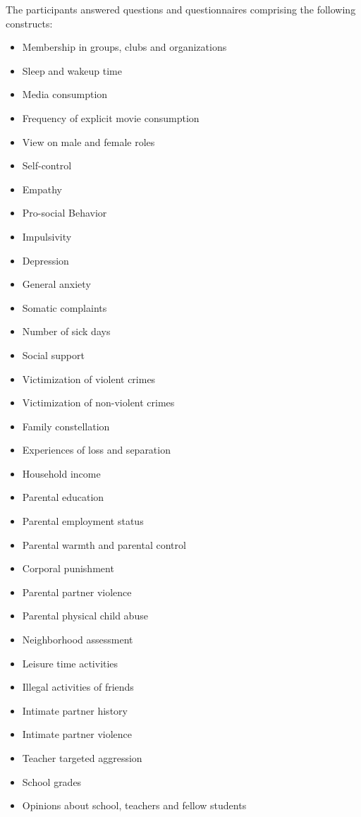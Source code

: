\documentclass[a4paper,12pt]{article} %
\begin{document}
The participants answered questions and questionnaires comprising the following constructs:
\setlength{\columnsep}{-0.2in}
\begin{multicols}{3}
	\begin{itemize}
		\setlength{\itemsep}{0pt}%
		\setlength{\parskip}{0pt}
		\item Membership in groups, clubs and organizations
		\item Sleep and wakeup time
		\item Media consumption
		\item Frequency of explicit movie consumption
		\item View on male and female roles
		\item Self-control
		\item Empathy
		\item Pro-social Behavior
		\item Impulsivity
		\item Depression
		\item General anxiety
		\item Somatic complaints
		\item Number of sick days
		\item Social support
		\item Victimization of violent crimes
		\item Victimization of non-violent crimes
		\item Family constellation
		\item Experiences of loss and separation
		\item Household income
		\item Parental education
		\item Parental employment status
		\item Parental warmth and parental control
		\item Corporal punishment
		\item Parental partner violence
		\item Parental physical child abuse
		\item Neighborhood assessment
		\item Leisure time activities
		\item Illegal activities of friends
		\item Intimate partner history
		\item Intimate partner violence
		\item Teacher targeted aggression
		\item School grades
		\item Opinions about school, teachers and fellow students

\end{itemize}
\end{multicols}
\end{document}
